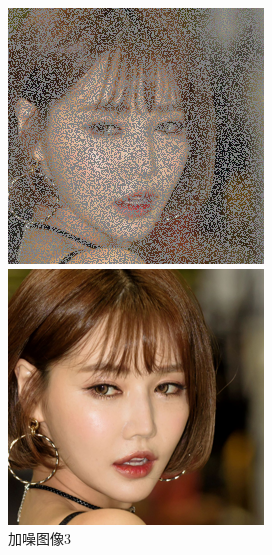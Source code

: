 \begin{figure}[H]
  \centering
  \begin{minipage}[b]{0.3\linewidth}
\includegraphics[width=\linewidth]{Picture/input/00002.png}
    \caption{加噪图像3}
    \label{noised image 3}
  \end{minipage}
  \hspace{0.1cm} %
   \begin{minipage}[b]{0.3\linewidth}
    \includegraphics[width=\linewidth]{Picture/label/00002.png}

\end{minipage}
\end{figure}
